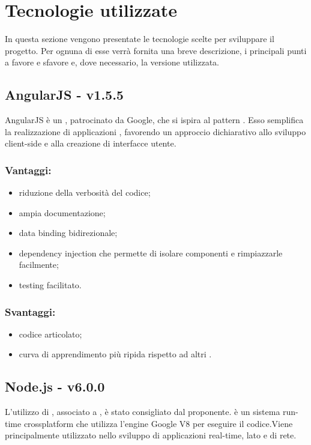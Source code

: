 \documentclass[a4paper, titlepage]{article}
\begin{document}
\newpage

\section{Tecnologie utilizzate}
In questa sezione vengono presentate le tecnologie scelte per sviluppare il progetto. Per ognuna di esse verrà fornita una breve descrizione, i principali punti a favore e sfavore e, dove necessario, la versione utilizzata.

\subsection{AngularJS - v1.5.5}
AngularJS è un   , patrocinato da Google, che si ispira al pattern .
Esso semplifica la realizzazione di applicazioni , favorendo un approccio dichiarativo allo sviluppo client-side e alla creazione di interfacce utente.

\subsubsection{Vantaggi:}
\begin{itemize}
	\item riduzione della verbosità del codice;
	\item ampia documentazione;
	\item data binding bidirezionale;
	\item dependency injection che permette di isolare componenti e rimpiazzarle facilmente;
	\item testing facilitato.
\end{itemize}

\subsubsection{Svantaggi:}
\begin{itemize}
	\item codice articolato;
	\item curva di apprendimento più ripida rispetto ad altri .
\end{itemize}

\subsection{Node.js - v6.0.0}
L'utilizzo di , associato a , è stato consigliato dal proponente.  è un sistema run-time crossplatform che utilizza l’engine Google V8  per eseguire il codice.\newline Viene principalmente utilizzato nello sviluppo di applicazioni real-time, lato  e di rete.
\end{document}
